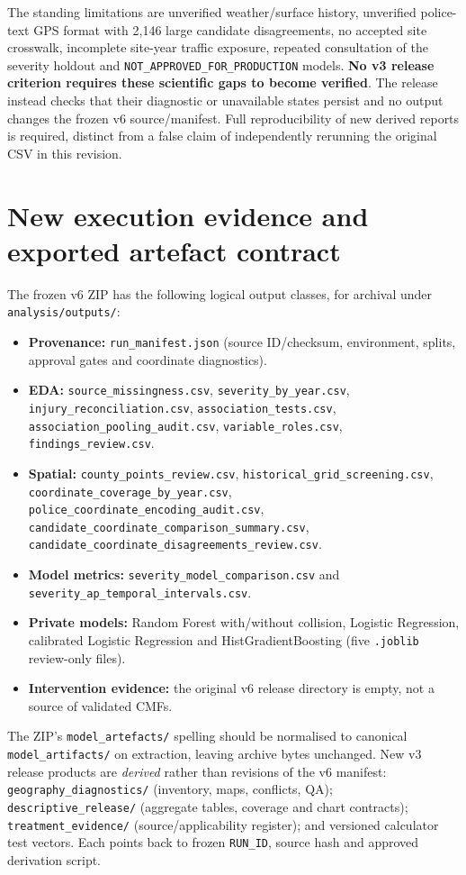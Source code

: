 \documentclass[11pt,a4paper,openany]{report}
\newcommand{\pathcode}[1]{\nolinkurl{#1}}
\begin{document}
The standing limitations are unverified weather/surface history, unverified police-text GPS format with 2,146 large candidate disagreements, no accepted site crosswalk, incomplete site-year traffic exposure, repeated consultation of the severity holdout and \pathcode{NOT_APPROVED_FOR_PRODUCTION} models. \textbf{No v3 release criterion requires these scientific gaps to become verified}. The release instead checks that their diagnostic or unavailable states persist and no output changes the frozen v6 source/manifest. Full reproducibility of new derived reports is required, distinct from a false claim of independently rerunning the original CSV in this revision.

\section{New execution evidence and exported artefact contract}
The frozen v6 ZIP has the following logical output classes, for archival under \pathcode{analysis/outputs/}:
\begin{itemize}
\item \textbf{Provenance:} \pathcode{run_manifest.json} (source ID/checksum, environment, splits, approval gates and coordinate diagnostics).
\item \textbf{EDA:} \pathcode{source_missingness.csv}, \pathcode{severity_by_year.csv}, \pathcode{injury_reconciliation.csv}, \pathcode{association_tests.csv}, \pathcode{association_pooling_audit.csv}, \pathcode{variable_roles.csv}, \pathcode{findings_review.csv}.
\item \textbf{Spatial:} \pathcode{county_points_review.csv}, \pathcode{historical_grid_screening.csv}, \pathcode{coordinate_coverage_by_year.csv}, \pathcode{police_coordinate_encoding_audit.csv}, \pathcode{candidate_coordinate_comparison_summary.csv}, \pathcode{candidate_coordinate_disagreements_review.csv}.
\item \textbf{Model metrics:} \pathcode{severity_model_comparison.csv} and \pathcode{severity_ap_temporal_intervals.csv}.
\item \textbf{Private models:} Random Forest with/without collision, Logistic Regression, calibrated Logistic Regression and HistGradientBoosting (five \pathcode{.joblib} review-only files).
\item \textbf{Intervention evidence:} the original v6 release directory is empty, not a source of validated CMFs.
\end{itemize}
The ZIP's \pathcode{model_artefacts/} spelling should be normalised to canonical \pathcode{model_artifacts/} on extraction, leaving archive bytes unchanged. New v3 release products are \emph{derived} rather than revisions of the v6 manifest: \pathcode{geography_diagnostics/} (inventory, maps, conflicts, QA); \pathcode{descriptive_release/} (aggregate tables, coverage and chart contracts); \pathcode{treatment_evidence/} (source/applicability register); and versioned calculator test vectors. Each points back to frozen \pathcode{RUN_ID}, source hash and approved derivation script.
\end{document}
